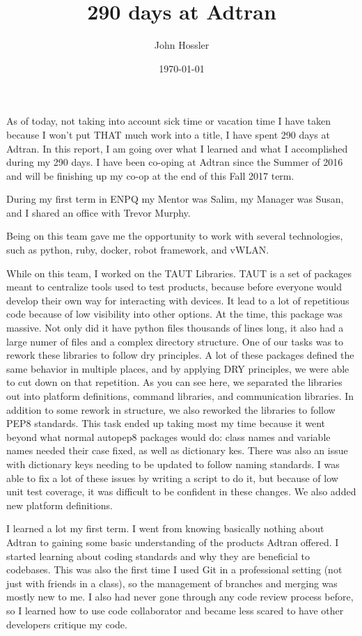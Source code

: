 \documentclass[12pt, letterpaper]{article}
\title{290 days at Adtran}
\author{John Hossler}
\date{\today}
\begin{document}
\maketitle

\par
As of today, not taking into account sick time or vacation time I have taken because I won't put THAT much work into a title, I have spent 290 days at Adtran.
In this report, I am going over what I learned and what I accomplished during my 290 days.
I have been co-oping at Adtran since the Summer of 2016 and will be finishing up my co-op at the end of this Fall 2017 term.
\par
During my first term in ENPQ my Mentor was Salim, my Manager was Susan, and I shared an office with Trevor Murphy.

\par
Being on this team gave me the opportunity to work with several technologies, such as python, ruby, docker, robot framework, and vWLAN.

\par
While on this team, I worked on the TAUT Libraries. TAUT is a set of packages meant to centralize tools used to test products, because before everyone would develop their own way for interacting with devices. It lead to a lot of repetitious code because of low visibility into other options. At the time, this package was
massive. Not only did it have python files thousands of lines long, it also had a large numer of
files and a complex directory structure. One of our tasks was to rework these libraries to follow
dry principles. A lot of these packages defined the same behavior in multiple places, and by
applying DRY principles, we were able to cut down on that repetition. As you can see here, we
separated the libraries out into platform definitions, command libraries, and communication
libraries. In addition to some rework in structure, we also reworked the libraries to follow PEP8
standards. This task ended up taking most my time because it went beyond what normal autopep8
packages would do: class names and variable names needed their case fixed, as well as dictionary
kes. There was also an issue with dictionary keys needing to be updated to follow naming standards.
I was able to fix a lot of these issues by writing a script to do it, but because of low unit test
coverage, it was difficult to be confident in these changes. We also added new platform
definitions.

\par
I learned a lot my first term. I went from knowing basically nothing about Adtran to gaining some
basic understanding of the products Adtran offered. I started learning about coding standards and why they are beneficial to codebases. This was also the first time I used Git in a
professional setting (not just with friends in a class), so the management of branches and merging
was mostly new to me. I also had never gone through any code review process before, so I learned
how to use code collaborator and became less scared to have other developers critique my code.
\end{document}
